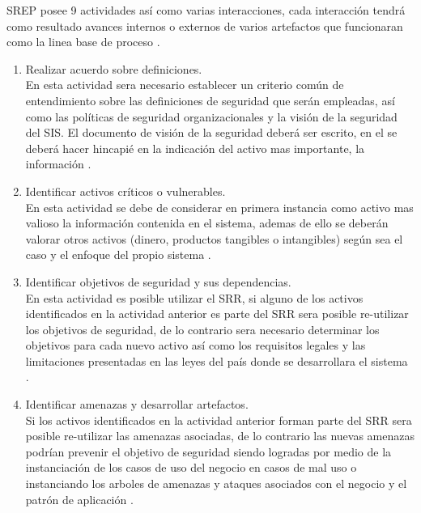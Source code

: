\documentclass[runningheads,a4paper]{llncs}
\begin{document}
\gls{SREP} posee 9 actividades así como varias interacciones, cada interacción tendrá como resultado avances internos o externos de varios artefactos que funcionaran como la linea base de proceso \cite{SREPMellado}.

\begin{enumerate}
	\item Realizar acuerdo sobre definiciones.\\
	
	En esta actividad sera necesario establecer un criterio común de entendimiento sobre las definiciones de seguridad que serán empleadas, así como las políticas de seguridad organizacionales y la visión de la seguridad del \gls{SIS}. El documento de visión de la seguridad deberá ser escrito, en el se deberá hacer hincapié en la indicación del activo mas importante, la información \cite{SREPMellado}.\\
	
	\item Identificar activos críticos o vulnerables.\\
	
	En esta actividad se debe de considerar en primera instancia como activo mas valioso la información contenida en el sistema, ademas de ello se deberán valorar otros activos (dinero, productos tangibles o intangibles) según sea el caso y el enfoque del propio sistema \cite{SREPMellado}.\\
	
	\item Identificar objetivos de seguridad y sus dependencias.\\
	
	En esta actividad es posible utilizar el \gls{SRR}, si alguno de los activos identificados en la actividad anterior es parte del \gls{SRR} sera posible re-utilizar los objetivos de seguridad, de lo contrario sera necesario determinar los objetivos para cada nuevo activo así como los requisitos legales y las limitaciones presentadas en las leyes del país donde se desarrollara el sistema \cite{SREPMellado}.\\
	
	\item Identificar amenazas y desarrollar artefactos.\\
	
	Si los activos identificados en la actividad anterior forman parte del \gls{SRR} sera posible re-utilizar las amenazas asociadas, de lo contrario las nuevas amenazas podrían prevenir el objetivo de seguridad siendo logradas por medio de la instanciación de los casos de uso del negocio en casos de mal uso o instanciando los arboles de amenazas y ataques asociados con el negocio y el patrón de aplicación \cite{SREPMellado}. \\
	

\end{enumerate}
\end{document}
